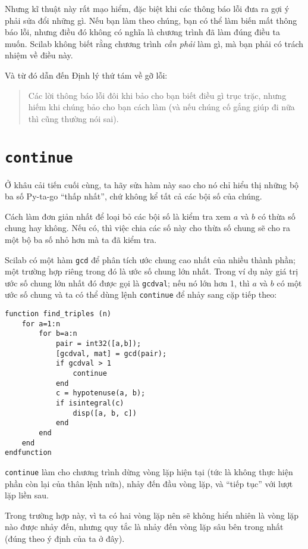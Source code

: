 \documentclass[12pt]{book}
\begin{document}
Nhưng kĩ thuật này rất mạo hiểm, đặc biệt khi các thông báo lỗi
đưa ra gợi ý phải sửa đổi những gì. Nếu bạn làm theo chúng, bạn
có thể làm biến mất thông báo lỗi, nhưng điều đó không có nghĩa
là chương trình đã làm đúng điều ta muốn. Scilab không biết rằng
chương trình {\em cần phải} làm gì, mà bạn phải có trách nhiệm
về điều này.

Và từ đó dẫn đến Định lý thứ tám về gỡ lỗi:

\begin{quote}
Các lời thông báo lỗi đôi khi bảo cho bạn biết điều gì trục trặc,
nhưng hiếm khi chúng bảo cho bạn cách làm (và nếu chúng cố gắng
giúp đi nữa thì cũng thường nói sai).
\end{quote}


\section{{\tt continue}}

Ở khâu cải tiến cuối cùng, ta hãy sửa hàm này sao cho nó chỉ 
hiểu thị những bộ ba số Py-ta-go ``thấp nhất'', chứ không kể tất cả
các bội số của chúng.

Cách làm đơn giản nhất để loại bỏ các bội số là kiểm tra xem 
$a$ và $b$ có thừa số chung hay không. Nếu có, thì việc chia
các số này cho thừa số chung sẽ cho ra một bộ ba số nhỏ hơn
mà ta đã kiểm tra.

Scilab có một hàm {\tt gcd} để phân tích ước chung cao nhất của nhiều
thành phần; một trường hợp riêng trong đó là ước số chung lớn nhất.
Trong ví dụ này giá trị ước số chung lớn nhất đó được gọi là 
\texttt{gcdval}; nếu nó lớn hơn 1, thì $a$ và $b$ có một 
ước số chung và ta có thể dùng lệnh {\tt continue} để
nhảy sang cặp tiếp theo:

\begin{verbatim}
function find_triples (n)
    for a=1:n
        for b=a:n
            pair = int32([a,b]);
            [gcdval, mat] = gcd(pair);
            if gcdval > 1
                continue
            end
            c = hypotenuse(a, b);
            if isintegral(c)
                disp([a, b, c])
            end
        end
    end
endfunction
\end{verbatim}

{\tt continue} làm cho chương trình dừng vòng lặp hiện tại
(tức là không thực hiện phần còn lại của thân lệnh nữa), 
nhảy đến đầu vòng lặp, và ``tiếp tục'' với lượt lặp liền sau.

Trong trường hợp này, vì ta có hai vòng lặp nên sẽ không hiển
nhiên là vòng lặp nào được nhảy đến, nhưng quy tắc là nhảy đến
vòng lặp sâu bên trong nhất (đúng theo ý định của ta ở đây).
\end{document}
